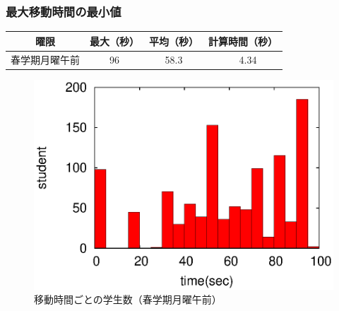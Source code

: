\documentclass[dvipdfmx,12pt]{beamer}
\begin{document}
\begin{frame}\frametitle{最大移動時間の最小値}
\begin{table}
\begin{center}
\vspace{-5pt}
\begin{tabular}{|r|cc|c|}
\hline
\multicolumn{1}{|c|}{曜限} &  最大（秒）  & 平均（秒） & 計算時間（秒）\\
\hline
春学期月曜午前  & 96  & 58.3 &　4.34\\  
\hline                                        	         
\end{tabular}
\end{center}
\end{table}

\begin{figure}[thpb]
\begin{center}
\includegraphics[bb=0 0 390 248,clip,scale=0.7]{oMo12_pawapohist.eps}
\hspace{-10mm} 
\vspace{-5mm}
\caption{移動時間ごとの学生数（春学期月曜午前）}
\label{omo12}
\end{center}
\end{figure}


\end{frame}
\end{document}
